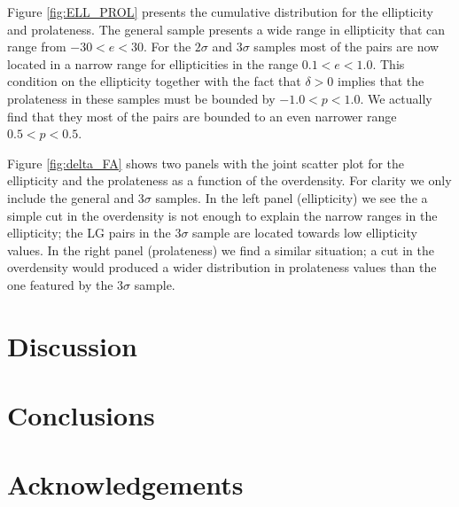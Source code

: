 \documentclass{emulateapj}
\begin{document}
Figure \ref{fig:ELL_PROL} presents the cumulative distribution for
the ellipticity and prolateness. The general sample presents a wide
range in ellipticity that can range from $-30<e<30$. For the $2\sigma$
and $3\sigma$ samples most of the pairs are now located in a narrow
range for ellipticities in the range $0.1<e<1.0$. This condition on
the ellipticity together with the fact that $\delta>0$ implies that
the prolateness in these samples must be bounded by
$-1.0<p<1.0$. We actually find that they most of the pairs are bounded
to an even narrower range $0.5<p<0.5$. 

Figure \ref{fig:delta_FA} shows two panels with the joint scatter plot
for the ellipticity and the prolateness as a function of the
overdensity. For clarity we only include the general and $3\sigma$
samples. In the left panel (ellipticity) we see the a simple cut in
the overdensity is not enough to explain the narrow ranges in the
ellipticity; the LG pairs in the $3\sigma$ sample are located towards
low ellipticity values. In the right panel (prolateness) we find a
similar situation; a cut in the overdensity would produced a wider
distribution in prolateness values than the one featured by the
$3\sigma$ sample.



\section{Discussion}
\label{sec:discussion}

\section{Conclusions}
\label{sec:conclusions}


\section*{Acknowledgements}


 
\end{document}
